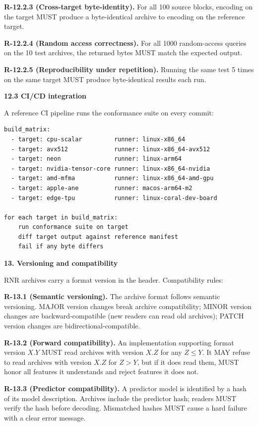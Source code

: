 \documentclass[
]{article}
\begin{document}
\textbf{R-12.2.3 (Cross-target byte-identity).} For all 100 source
blocks, encoding on the target MUST produce a byte-identical archive to
encoding on the reference target.

\textbf{R-12.2.4 (Random access correctness).} For all 1000
random-access queries on the 10 test archives, the returned bytes MUST
match the expected output.

\textbf{R-12.2.5 (Reproducibility under repetition).} Running the same
test 5 times on the same target MUST produce byte-identical results each
run.

\textbf{12.3 CI/CD integration}

A reference CI pipeline runs the conformance suite on every commit:
\begin{verbatim}
build_matrix:
  - target: cpu-scalar         runner: linux-x86_64
  - target: avx512             runner: linux-x86_64-avx512
  - target: neon               runner: linux-arm64
  - target: nvidia-tensor-core runner: linux-x86_64-nvidia
  - target: amd-mfma           runner: linux-x86_64-amd-gpu
  - target: apple-ane          runner: macos-arm64-m2
  - target: edge-tpu           runner: linux-coral-dev-board

for each target in build_matrix:
    run conformance suite on target
    diff target output against reference manifest
    fail if any byte differs
\end{verbatim}

\textbf{13. Versioning and compatibility}

RNR archives carry a format version in the header. Compatibility rules:

\textbf{R-13.1 (Semantic versioning).} The archive format follows
semantic versioning. MAJOR version changes break archive compatibility;
MINOR version changes are backward-compatible (new readers can read old
archives); PATCH version changes are bidirectional-compatible.

\textbf{R-13.2 (Forward compatibility).} An implementation
supporting format version $X.Y$ MUST read archives with version
$X.Z$ for any $Z \leq Y$. It MAY refuse to read archives with
version $X.Z$ for $Z > Y$, but if it does read them, MUST honor all
features it understands and reject features it does not.

\textbf{R-13.3 (Predictor compatibility).} A predictor model is
identified by a hash of its model description. Archives include the
predictor hash; readers MUST verify the hash before decoding.
Mismatched hashes MUST cause a hard failure with a clear error
message.
\end{document}
